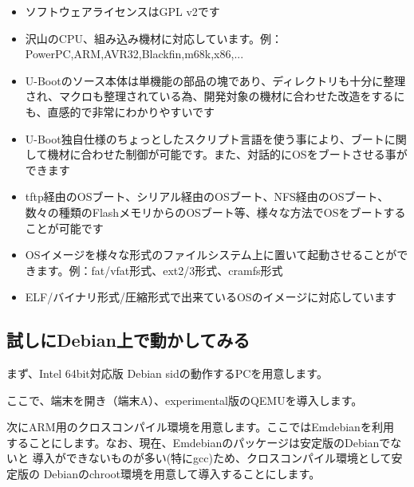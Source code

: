 \documentclass[mingoth,a4paper]{jsarticle}
\begin{document}
\begin{itemize}
\item ソフトウェアライセンスはGPL v2です
\item 沢山のCPU、組み込み機材に対応しています。例：PowerPC,ARM,AVR32,Blackfin,m68k,x86,...
\item U-Bootのソース本体は単機能の部品の塊であり、ディレクトリも十分に整理され、マクロも整理されている為、開発対象の機材に合わせた改造をするにも、直感的で非常にわかりやすいです
\item U-Boot独自仕様のちょっとしたスクリプト言語を使う事により、ブートに関して機材に合わせた制御が可能です。また、対話的にOSをブートさせる事ができます
\item tftp経由のOSブート、シリアル経由のOSブート、NFS経由のOSブート、数々の種類のFlashメモリからのOSブート等、様々な方法でOSをブートすることが可能です
\item OSイメージを様々な形式のファイルシステム上に置いて起動させることができます。例：fat/vfat形式、ext2/3形式、cramfs形式
\item ELF/バイナリ形式/圧縮形式で出来ているOSのイメージに対応しています
\end{itemize}

\subsection{試しにDebian上で動かしてみる}

まず、Intel 64bit対応版 Debian sidの動作するPCを用意します。

ここで、端末を開き（端末A）、experimental版のQEMUを導入します。

次にARM用のクロスコンパイル環境を用意します。ここではEmdebianを利用
することにします。なお、現在、Emdebianのパッケージは安定版のDebianでないと
導入ができないものが多い(特にgcc)ため、クロスコンパイル環境として安定版の
Debianのchroot環境を用意して導入することにします。
\end{document}
